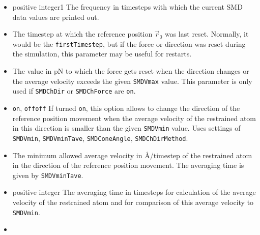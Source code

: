\begin{itemize}
\item
{}
{positive integer}{1} {The frequency in timesteps with which the
current SMD data values are printed out.}

\item
{}
{The timestep at which the reference position $\vec r_0$ was last
reset. Normally, it would be the \verb!firstTimestep!, but if the
force or direction was reset during the simulation, this parameter may
be useful for restarts.}

\item
{} {The value in pN to which the force gets reset when the
direction changes or the average velocity exceeds the given
\verb!SMDVmax! value. This parameter is only used if \verb!SMDChDir!
or \verb!SMDChForce! are
\verb!on!.}

\item
{}
{\verb!on!, \verb!off!}{\verb!off!}
{If turned \verb!on!, this option allows to change the direction of
the reference position movement when the average velocity of the
restrained atom in this direction is smaller than the given
\verb!SMDVmin! value. Uses settings of 
\verb!SMDVmin!, \verb!SMDVminTave!, \verb!SMDConeAngle!,
\verb!SMDChDirMethod!.}

\item
{} {The minimum allowed average velocity in
\AA/timestep of the restrained atom in the direction of the reference
position movement. The averaging time is given by \verb!SMDVminTave!.}

\item
{}
{positive integer} {The averaging time in timesteps for calculation of
the average velocity of the restrained atom and for comparison of this
average velocity to
\verb!SMDVmin!.}

\item
{}


\end{itemize}
